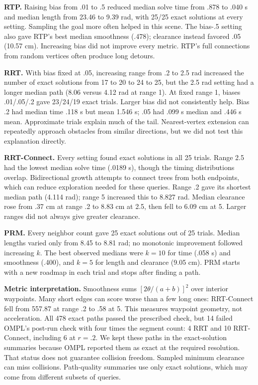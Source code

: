 \textbf{RTP.} Raising bias from .01 to .5 reduced median solve time from .878 to .040 s and median length from 23.46 to 9.39 rad, with 25/25 exact solutions at every setting. Sampling the goal more often helped in this scene. The bias-.5 setting also gave RTP's best median smoothness (.478); clearance instead favored .05 (10.57 cm). Increasing bias did not improve every metric. RTP's full connections from random vertices often produce long detours.

\textbf{RRT.} With bias fixed at .05, increasing range from .2 to 2.5 rad increased the number of exact solutions from 17 to 20 to 24 to 25, but the 2.5 rad setting had a longer median path (8.06 versus 4.12 rad at range 1). At fixed range 1, biases .01/.05/.2 gave 23/24/19 exact trials. Larger bias did not consistently help. Bias .2 had median time .118 s but mean 1.546 s; .05 had .099 s median and .446 s mean. Approximate trials explain much of the tail. Nearest-vertex extension can repeatedly approach obstacles from similar directions, but we did not test this explanation directly.

\textbf{RRT-Connect.} Every setting found exact solutions in all 25 trials. Range 2.5 had the lowest median solve time (.0189 s), though the timing distributions overlap. Bidirectional growth attempts to connect trees from both endpoints, which can reduce exploration needed for these queries. Range .2 gave its shortest median path (4.114 rad); range 5 increased this to 8.827 rad. Median clearance rose from .37 cm at range .2 to 8.83 cm at 2.5, then fell to 6.09 cm at 5. Larger ranges did not always give greater clearance.

\textbf{PRM.} Every neighbor count gave 25 exact solutions out of 25 trials. Median lengths varied only from 8.45 to 8.81 rad; no monotonic improvement followed increasing $k$. The best observed medians were $k=10$ for time (.058 s) and smoothness (.400), and $k=5$ for length and clearance (9.05 cm). PRM starts with a new roadmap in each trial and stops after finding a path.

\textbf{Metric interpretation.} Smoothness sums $[2\theta/(a+b)]^2$ over interior waypoints. Many short edges can score worse than a few long ones: RRT-Connect fell from 557.87 at range .2 to .58 at 5. This measures waypoint geometry, not acceleration. All 478 exact paths passed the prescribed check, but 14 failed OMPL's post-run check with four times the segment count: 4 RRT and 10 RRT-Connect, including 6 at $r=.2$. We kept these paths in the exact-solution summaries because OMPL reported them as exact at the required resolution. That status does not guarantee collision freedom. Sampled minimum clearance can miss collisions. Path-quality summaries use only exact solutions, which may come from different subsets of queries.
